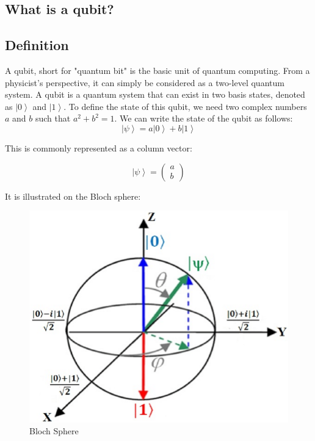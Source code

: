 \documentclass{article}
\begin{document}
\begin{multicols}{2}

\section{What is a qubit?}
\subsection{Definition}

A qubit, short for "quantum bit" is the basic unit of quantum computing. From a physicist's perspective, it can simply be considered as a two-level quantum system. A qubit is a quantum system that can exist in two basis states, denoted as $\left|0\right>$ and $\left|1\right>$. To define the state of this qubit, we need two complex numbers \( a \) and \( b \) such that \( a^2 + b^2 = 1 \). We can write the state of the qubit as follows:
\begin{equation}
\left|\psi\right> = a\left|0\right> + b\left|1\right>
\end{equation}

This is commonly represented as a column vector:

\begin{equation}
\left|\psi\right> = \begin{pmatrix} a \\ b \end{pmatrix}
\end{equation}

It is illustrated on the Bloch sphere:

\begin{figure}[H]
    \centering
    \includegraphics[width = \columnwidth]{fig/bloch_sphere.png}
    \caption{Bloch Sphere}
    \label{fig:sphere_de_bloch}
\end{figure}




\end{multicols}
\end{document}
